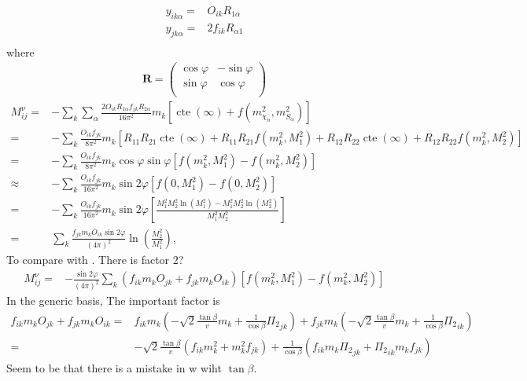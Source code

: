 \begin{align}
  y_{i k\alpha}=&O_{i k}R_{1\alpha} \nonumber\\
  y_{j k\alpha}=&2f_{i k}R_{\alpha 1} \nonumber\\
\end{align}
where
\begin{align}
  \mathbf{R}=
  \begin{pmatrix}
    \cos\varphi & -\sin\varphi\\
    \sin\varphi & \cos\varphi\\    
  \end{pmatrix}
\end{align}
\begin{align}
  M^{\nu}_{ij}=&-\sum_k \sum_{\alpha}
\frac{2O_{ik}R_{1\alpha}f_{jk} R_{2\alpha}}{16\pi^2}m_{k}\left[ \operatorname{cte}(\infty)+
f \left( m_{\chi_n}^2,m_{S_{\alpha}}^2 \right) \right] \nonumber\\
=&-\sum_k 
\frac{O_{ik}f_{jk} }{8\pi^2}m_{k}\left[ R_{11}R_{21}\operatorname{cte}(\infty)+
R_{11}R_{21}f \left( m_k^2,M_1^2 \right)
+R_{12}R_{22}\operatorname{cte}(\infty)+
R_{12}R_{22}f \left( m_k^2,M_2^2 \right) \right] \nonumber\\
=&-\sum_k \frac{O_{ik}f_{jk} }{8\pi^2}m_{k}\cos\varphi\sin\varphi
\left[f \left( m_k^2,M_1^2 \right)-f \left(m_k^2,M_2^2 \right) \right] \nonumber\\
\approx&-\sum_k \frac{O_{ik}f_{jk} }{16\pi^2}m_{k}\sin 2\varphi
\left[f \left( 0,M_1^2 \right)-f \left(0,M_2^2 \right) \right] \nonumber\\
=&-\sum_k \frac{O_{ik}f_{jk} }{16\pi^2}m_{k}\sin2\varphi
\left[\frac{M_1^2M_2^2\ln \left(M_1^2\right)-M_1^2M_2^2\ln \left(M_2^2\right)}{M_1^2M_2^2} \right] \nonumber\\
=&\sum_k \frac{f_{jk}m_kO_{ik} \sin2\varphi }{(4\pi)^2}
\ln \left( \frac{M_2^2}{M_1^2}\right),
\end{align}
To compare with \cite{AristizabalSierra:2006ri}. There is factor 2?
\begin{align}
  M^{\nu}_{ij} =&-\frac{\sin2\varphi}{\left(4\pi\right)^2}\sum_k \left( f_{ik}m_kO_{jk} +f_{jk}m_kO_{ik} \right)
\left[f \left( m_k^2,M_1^2 \right)-f \left(m_k^2,M_2^2 \right) \right]
\end{align}
In the generic basis, The important factor is
\begin{align}
\label{eq:gz}
  f_{ik}m_kO_{jk} +f_{jk}m_kO_{ik}=&
f_{ik}m_k \left(  -\sqrt{2}\frac{\tan\beta}{v}m_k+\frac{1}{\cos\beta}{\Pi_2}_{jk} \right)
+f_{jk}m_k\left( -\sqrt{2}\frac{\tan\beta}{v}m_k+\frac{1}{\cos\beta}{\Pi_2}_{ik} \right) \nonumber\\
=&
-\sqrt{2}\frac{\tan\beta}{v}\left(f_{ik}m_k^2+m_k^2f_{jk}\right)
 +\frac{1}{\cos\beta}\left(  f_{ik}m_k{\Pi_2}_{jk}+{\Pi_2}_{ik}m_kf_{jk} \right)
\end{align}
Seem to be that there is a mistake in \cite{hep-ph/0307172}w wiht $\tan\beta$.
